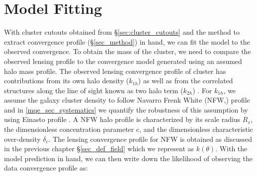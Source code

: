  \section{Model Fitting}
 \label{sec_model_fitting}
 With cluster cutouts obtained from \S\ref{sec:cluster_cutouts} and the method to extract convergence profile (\S\ref{sec_method}) in hand, we can fit the model to the observed convergence.
To obtain the mass of the cluster, we need to compare the observed lensing profile to the convergence model generated using an assumed halo mass profile.
 The observed lensing convergence profile of cluster has contributions from its own halo density ($k_{1h}$) as well as from the correlated structures along the line of sight known as two halo term ($k_{2h}$) \citep{oguri11}.
 For $k_{1h}$, we assume the galaxy cluster density to follow Navarro Frenk White (NFW,\citep{navarro96}) profile and in \ref{mqe_sec_systematics} we quantify the robustness of this assumption by using Einasto profile \citep{einasto89}.
 A NFW halo profile is characterized by its scale radius $R_{s}$, the dimensionless concentration parameter c, and the dimensionless characteristic over-density $\delta_{c}$.
 The lensing convergence profile for NFW is obtained as discussed in the previous chapter \S\ref{sec_def_field} which we represent as $k(\theta)$.
%
With the model prediction in hand, we can then write down the likelihood of observing the data convergence profile as: 
